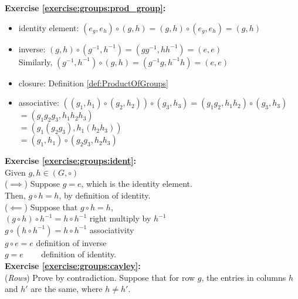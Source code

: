 \noindent\textbf{Exercise \ref{exercise:groups:prod_group}:}
\begin{itemize}
\item
identity element: $(e_g, e_h) \circ (g, h) = (g, h) \circ (e_g, e_h) = (g, h)$

\item
inverse: $(g, h) \circ (g^{-1}, h^{-1}) = (g g^{-1}, h h^{-1}) = (e, e)$\\
Similarly, $(g^{-1}, h^{-1}) \circ (g, h)  = ( g^{-1} g,  h^{-1}h) = (e, e)$

\item
closure: Definition \ref{def:ProductOfGroups}

\item
associative: $((g_1, h_1) \circ (g_2, h_2)) \circ (g_3, h_3) = (g_1 g_2, h_1 h_2) \circ (g_3, h_3)$\\
$= (g_1 g_2 g_3, h_1 h_2 h_3)$\\
$= (g_1 (g_2 g_3), h_1 (h_2 h_3))$\\
$= (g_1, h_1) \circ (g_2 g_3, h_2 h_3)$
\end{itemize}

\noindent\textbf{Exercise \ref{exercise:groups:ident}:}
\\
Given $g, h \in (G, \circ)$\\
($\implies$) Suppose $g = e$, which is the identity element.\\
Then, $g \circ h = h$, by definition of identity.\\
($\impliedby$) Suppose that $g \circ h = h$,\\
$(g \circ h) \circ h^{-1} = h \circ h^{-1}$ \quad right multiply by $h^{-1}$\\
$g \circ (h \circ h^{-1}) = h \circ h^{-1}$ \quad associativity\\
$g \circ e = e$ \quad definition of inverse \\
$g = e$ \quad ~~~ definition of identity.
\\

\noindent\textbf{Exercise \ref{exercise:groups:cayley}:}
\\
(\emph{Rows})  Prove by contradiction. Suppose that for row $g$,  the entries in columns $h$ and $h'$ are the same, where $h \neq h'$.\\

